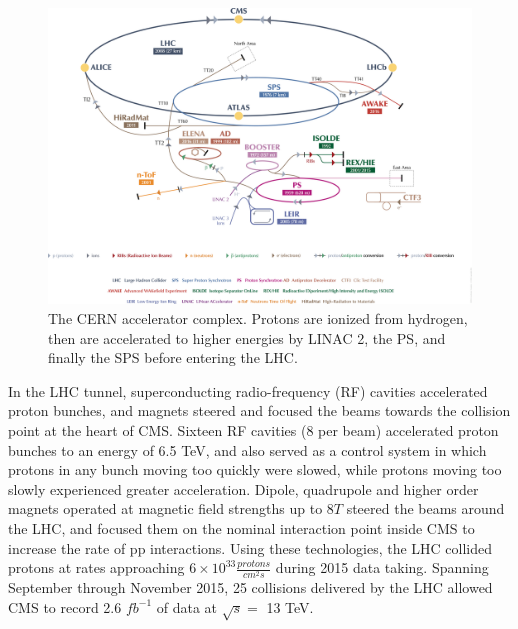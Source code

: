 \begin{figure}[ht]
	\centering
	\includegraphics[width=1\textwidth]{figures/CERNAcceleratorComplex.png}
	\caption{The CERN accelerator complex.  Protons are ionized from hydrogen, then are accelerated to higher 
	energies by LINAC 2, the PS, and finally the SPS before entering the LHC.}
	\label{fig:accelComplex}
\end{figure}


In the LHC tunnel, superconducting radio-frequency (RF) cavities accelerated proton bunches, and magnets steered and 
focused the beams towards the collision point at the heart of CMS.  Sixteen RF cavities (8 per beam) accelerated proton 
bunches to an energy of 6.5 TeV, and also served as a control system in which protons in any bunch moving too quickly 
were slowed, while protons moving too slowly experienced greater acceleration.  Dipole, quadrupole and higher order 
magnets operated at magnetic field strengths up to 8$\unit{T}$ steered the beams around the LHC, and focused them 
on the nominal interaction point inside CMS to increase the rate of pp interactions.  Using these technologies, the  
LHC collided protons at rates approaching $6 \times 10^{33} \frac{protons}{cm^{2}s}$ during 2015 data taking.  
Spanning September through November 2015, 25 \ns collisions delivered by the LHC allowed CMS to record 2.6 $fb^{-1}$ 
of data at $\sqrt{s} =$ 13 TeV.

